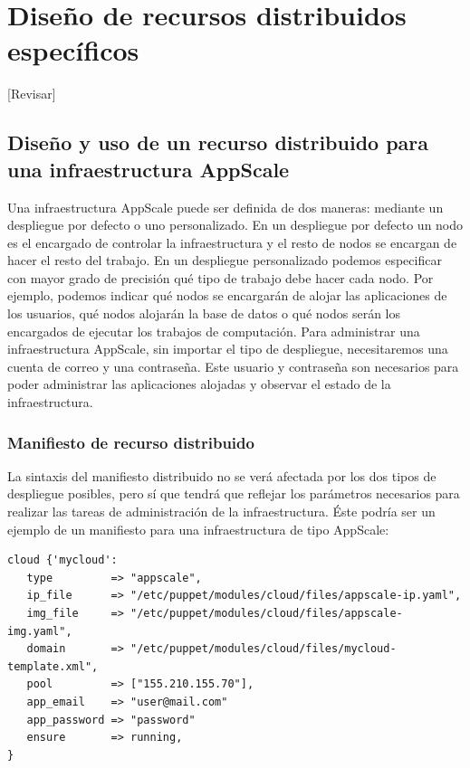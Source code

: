 \chapter{Diseño de recursos distribuidos específicos}
\label{cap:disenyo}


[Revisar]\\

\section{Diseño y uso de un recurso distribuido para una infraestructura AppScale}

Una infraestructura AppScale puede ser definida de dos maneras: mediante un despliegue por defecto o uno personalizado. En un despliegue por defecto un nodo es el encargado de controlar la infraestructura y el resto de nodos se encargan de hacer el resto del trabajo. En un despliegue personalizado podemos especificar con mayor grado de precisión qué tipo de trabajo debe hacer cada nodo. Por ejemplo, podemos indicar qué nodos se encargarán de alojar las aplicaciones de los usuarios, qué nodos alojarán la base de datos o qué nodos serán los encargados de ejecutar los trabajos de computación. Para administrar una infraestructura AppScale, sin importar el tipo de despliegue, necesitaremos una cuenta de correo y una contraseña. Este usuario y contraseña son necesarios para poder administrar las aplicaciones alojadas y observar el estado de la infraestructura.

\subsection{Manifiesto de recurso distribuido}

La sintaxis del manifiesto distribuido no se verá afectada por los dos tipos de despliegue posibles, pero sí que tendrá que reflejar los parámetros necesarios para realizar las tareas de administración de la infraestructura. Éste podría ser un ejemplo de un manifiesto para una infraestructura de tipo AppScale:

\begin{lstlisting}
cloud {'mycloud':
   type         => "appscale",
   ip_file      => "/etc/puppet/modules/cloud/files/appscale-ip.yaml",
   img_file     => "/etc/puppet/modules/cloud/files/appscale-img.yaml",
   domain       => "/etc/puppet/modules/cloud/files/mycloud-template.xml",
   pool         => ["155.210.155.70"],
   app_email    => "user@mail.com"
   app_password => "password"
   ensure       => running,
}
\end{lstlisting}

